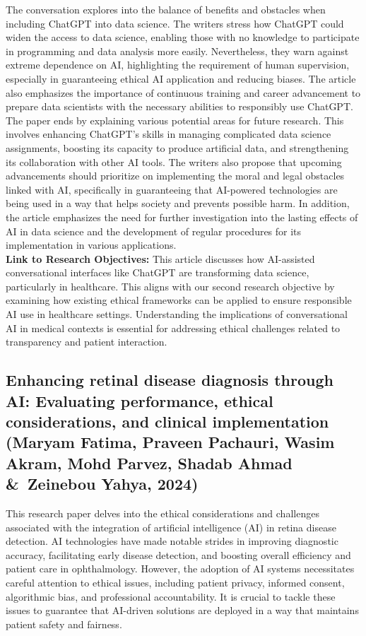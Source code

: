 \documentclass[a4paper, 12pt]{article}
\begin{document}
The conversation explores into the balance of benefits and obstacles when including ChatGPT into data science. The writers stress how ChatGPT could widen the access to data science, enabling those with no knowledge to participate in programming and data analysis more easily. Nevertheless, they warn against extreme dependence on AI, highlighting the requirement of human supervision, especially in guaranteeing ethical AI application and reducing biases. The article also emphasizes the importance of continuous training and career advancement to prepare data scientists with the necessary abilities to responsibly use ChatGPT.\\

The paper ends by explaining various potential areas for future research. This involves enhancing ChatGPT's skills in managing complicated data science assignments, boosting its capacity to produce artificial data, and strengthening its collaboration with other AI tools. The writers also propose that upcoming advancements should prioritize on implementing the moral and legal obstacles linked with AI, specifically in guaranteeing that AI-powered technologies are being used in a way that helps society and prevents possible harm. In addition, the article emphasizes the need for further investigation into the lasting effects of AI in data science and the development of regular procedures for its implementation in various applications.\\

\textbf{Link to Research Objectives:} This article discusses how AI-assisted conversational interfaces like ChatGPT are transforming data science, particularly in healthcare. This aligns with our second research objective by examining how existing ethical frameworks can be applied to ensure responsible AI use in healthcare settings. Understanding the implications of conversational AI in medical contexts is essential for addressing ethical challenges related to transparency and patient interaction.


\subsection{Enhancing retinal disease diagnosis through AI: Evaluating performance, ethical considerations, and clinical implementation (Maryam Fatima, Praveen Pachauri, Wasim Akram, Mohd Parvez, Shadab Ahmad \&\ Zeinebou Yahya, 2024)}
This research paper delves into the ethical considerations and challenges associated with the integration of artificial intelligence (AI) in retina disease detection. AI technologies have made notable strides in improving diagnostic accuracy, facilitating early disease detection, and boosting overall efficiency and patient care in ophthalmology. However, the adoption of AI systems necessitates careful attention to ethical issues, including patient privacy, informed consent, algorithmic bias, and professional accountability. It is crucial to tackle these issues to guarantee that AI-driven solutions are deployed in a way that maintains patient safety and fairness.\\
\end{document}
